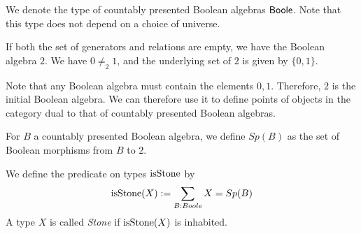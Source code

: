 \begin{remark}
  We denote the type of countably presented Boolean algebras $\mathsf{Boole}$. 
  Note that this type does not depend on a choice of universe. 
\end{remark}

\begin{example}
  If both the set of generators and relations are empty, we have the Boolean algebra $2$.
  We have $0\neq_2 1$, and the underlying set of $2$ is given by $\{0,1\}$.
\end{example}
Note that any Boolean algebra must contain the elements $0,1$. 
Therefore, $2$ is the initial Boolean algebra. 
We can therefore use it to define points of objects in the category dual to that of countably presented Boolean algebras. 

\begin{definition}
  For $B$ a countably presented Boolean algebra, we define $Sp(B)$ as the set of Boolean morphisms from $B$ to $2$. 
\end{definition}
\begin{definition}
  We define the predicate on types $\mathrm{isStone}$ by 
  \begin{equation}
    \mathrm{isStone}(X) := \sum\limits_{B : Boole} X = Sp(B)
  \end{equation} 
  A type $X$ is called \textit{Stone} if $\mathrm{isStone}(X)$ is inhabited.
\end{definition}


